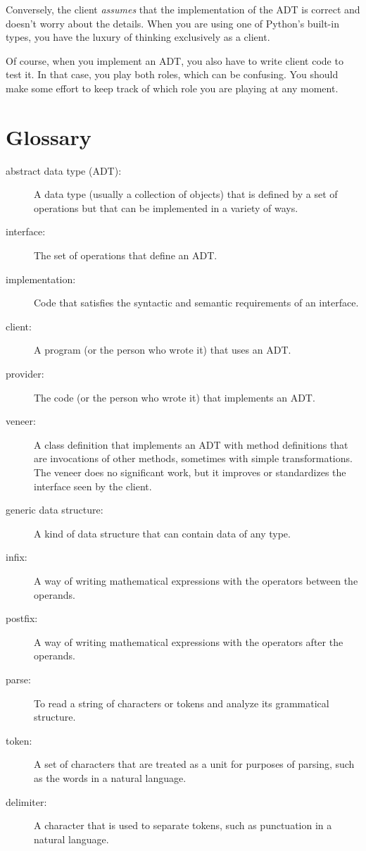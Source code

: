 Conversely, the client {\em assumes} that the implementation of the
ADT is correct and doesn't worry about the details.  When you
are using one of Python's built-in types, you have the luxury
of thinking exclusively as a client.

Of course, when you implement an ADT, you also have
to write client code to test it.  In that case, you play both
roles, which can be confusing.  You should make some effort
to keep track of which role you are playing at any moment.


\section{Glossary}

\begin{description}

\item[abstract data type (ADT):]  A data type (usually a collection
of objects) that is defined by a set of operations but that can
be implemented in a variety of ways.

\item[interface:] The set of operations that define an ADT.

\item[implementation:] Code that satisfies the syntactic and semantic
requirements of an interface.

\item[client:]  A program (or the person who wrote it) that uses an ADT.

\item[provider:] The code (or the person
who wrote it) that implements an ADT.

\item[veneer:]  A class definition that implements an ADT with
method definitions that are invocations of other methods, sometimes
with simple transformations.  The veneer does no significant work,
but it improves or standardizes the interface seen by the client.

\item[generic data structure:] A kind of data structure that can
contain data of any type.

\item[infix:]  A way of writing mathematical expressions with the
operators between the operands.

\item[postfix:]  A way of writing mathematical expressions with the
operators after the operands.

\item[parse:]  To read a string of characters or tokens and analyze
its grammatical structure.

\item[token:]  A set of characters that are treated as a unit for
purposes of parsing, such as the words in a natural language.

\item[delimiter:]  A character that is used to separate tokens,
such as punctuation in a natural language.

\end{description}

